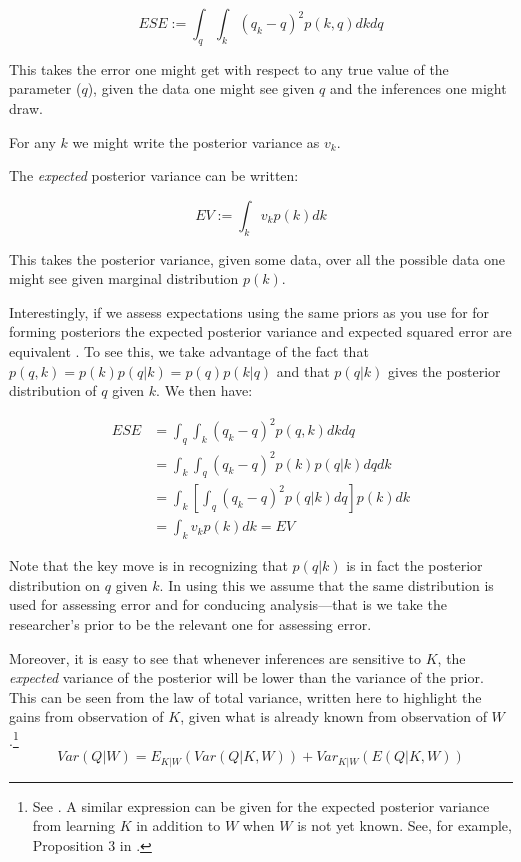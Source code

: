\documentclass[
  12pt,
]{book}
\begin{document}
\[ESE := \int_q\int_k \left({q}_k-q\right)^2p(k, q)dkdq \]

This takes the error one might get with respect to any true value of the parameter (\(q\)), given the data one might see given \(q\) and the inferences one might draw.

For any \(k\) we might write the posterior variance as \(v_k\).

The \emph{expected} posterior variance can be written:

\[EV := \int_k v_k p(k)dk\]

This takes the posterior variance, given some data, over all the possible data one might see given marginal distribution \(p(k)\).

Interestingly, if we assess expectations using the same priors as you use for for forming posteriors the expected posterior variance and expected squared error are equivalent \citep{scharf1991statistical}.
To see this, we take advantage of the fact that \(p(q,k) = p(k)p(q|k) = p(q)p(k|q)\) and that \(p(q|k)\) gives the posterior distribution of \(q\) given \(k\). We then have:

\begin{align}
ESE &= \int_q\int_k \left({q}_k-q\right)^2p(q,k)dkdq \\
    &= \int_k\int_q \left({q}_k-q\right)^2p(k)p(q|k)dq dk \\
    &= \int_k\left[\int_q \left({q}_k-q\right)^2p(q|k)dq\right]p(k)dk \\
    &= \int_k v_k p(k)dk  = EV
\end{align}

Note that the key move is in recognizing that \(p(q |k)\) is in fact the posterior distribution on \(q\) given \(k\). In using this we assume that the same distribution is used for assessing error and for conducing analysis---that is we take the researcher's prior to be the relevant one for assessing error.

Moreover, it is easy to see that whenever inferences are sensitive to \(K\), the \emph{expected} variance of the posterior will be lower than the variance of the prior. This can be seen from the law of total variance, written here to highlight the gains from observation of \(K\), given what is already known from observation of \(W\).\footnote{See \citet{raiffa1961applied}. A similar expression can be given for the expected posterior variance from learning \(K\) in addition to \(W\) when \(W\) is not yet known. See, for example, Proposition 3 in \citet{geweke2014analysis}.}\\
\[Var(Q|W) = E_{K|W}(Var(Q|K,W)) +Var_{K|W}(E(Q|K,W))\]
\end{document}

